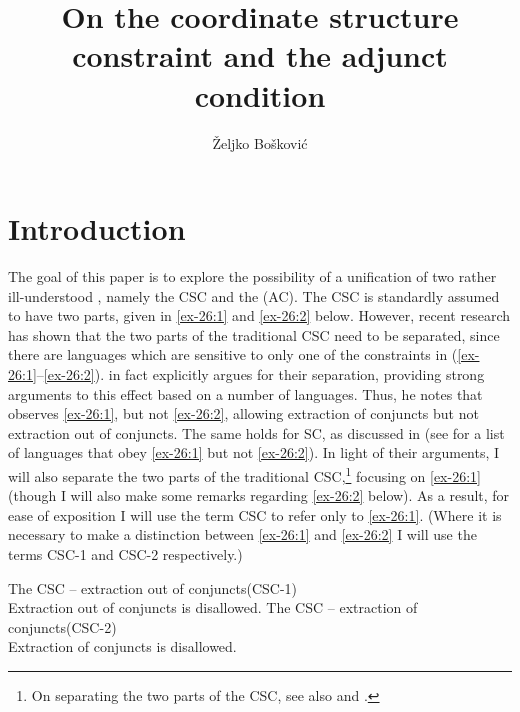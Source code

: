 \documentclass[output=paper]{langsci/langscibook}
\author{Željko Bošković\affiliation{University of Connecticut}}
\title{On the coordinate structure constraint and the adjunct condition}
\begin{document}
\glsresetall


\section{Introduction}

The goal of this paper is to explore the possibility of a unification of two
rather ill-understood , namely the \gls{CSC} and the  (AC). The \gls{CSC} is standardly assumed to have two parts, given in \eqref{ex-26:1} and
\eqref{ex-26:2} below.  However, recent research has shown that the two parts of the
traditional \gls{CSC} need to be separated,
since there are languages which are sensitive to only one of the constraints in
(\ref{ex-26:1}--\ref{ex-26:2}). \textcite{Oda:2017} in fact explicitly argues for their separation,
providing strong arguments to this effect based on a number of languages. Thus,
he notes that  observes \eqref{ex-26:1}, but not \eqref{ex-26:2}, allowing extraction of
conjuncts but not extraction out of conjuncts. The same holds for \gls{SC}, as
discussed in \textcite{Stjepanovic2014} (see \citealt{Oda:2017} for a list of
languages that obey \eqref{ex-26:1} but not \eqref{ex-26:2}). In light of their arguments, I will also
separate the two parts of the traditional \gls{CSC},\footnote{On separating the two parts of the
\gls{CSC}, see also \citet{Grosu1973} and
\citet{Postal1998}.} focusing on \eqref{ex-26:1} (though I will also make some remarks
regarding \eqref{ex-26:2} below).  As a result, for ease of exposition I will use the term
\gls{CSC} to refer only to \eqref{ex-26:1}. (Where it
is necessary to make a distinction between \eqref{ex-26:1} and \eqref{ex-26:2} I will use the terms
CSC-1 and CSC-2 respectively.)

\ea\label{ex-26:1}The \glsdesc{CSC} -- extraction out of conjuncts\hfill\hbox{(CSC-1)}\\
	Extraction out of conjuncts is disallowed.
\ex\label{ex-26:2}The \glsdesc{CSC} – extraction of conjuncts\hfill\hbox{(CSC-2)}\\
	Extraction of conjuncts is disallowed.
\z
\end{document}
